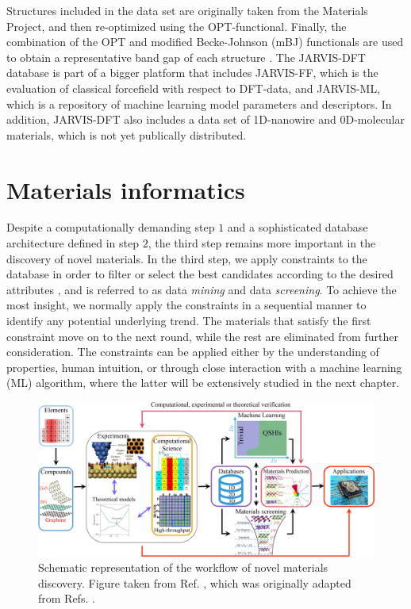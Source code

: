Structures included in the data set are originally taken from the Materials Project, and then re-optimized using the OPT-functional. Finally, the combination of the OPT and modified Becke-Johnson (mBJ) functionals are used to obtain a representative band gap of each structure \cite{Choudhary2018a}. %
The JARVIS-DFT database is part of a bigger platform that includes JARVIS-FF, which is the evaluation of classical forcefield with respect to DFT-data, and JARVIS-ML, which is a repository of machine learning model parameters and descriptors.
In addition, JARVIS-DFT also includes a data set of 1D-nanowire and 0D-molecular materials, which is not yet publically distributed.

\section{Materials informatics}

Despite a computationally demanding step $1$ and a sophisticated database architecture defined in step $2$, the third step remains more important in the discovery of novel materials. In the third step, we apply constraints to the database in order to filter or select the best candidates according to the desired attributes \cite{Schleder2019}, and is referred to as data \textit{mining} and data \textit{screening}. To achieve the most insight, we normally apply the constraints in a sequential manner to identify any potential underlying trend. The materials that satisfy the first constraint move on to the next round, while the rest are eliminated from further consideration. The constraints can be applied either by the understanding of properties, human intuition, or through close interaction with a machine learning (ML) algorithm, where the latter will be extensively studied in the next chapter.

\begin{figure}[ht!]
  \centering
  \includegraphics{theory/figures/ht-workflow.jpg}
  \caption{Schematic representation of the workflow of novel materials discovery.  Figure taken from Ref. \cite{Schleder2019}, which was originally adapted from Refs. \cite{Mounet2018, Acosta2018, Polini2013}.}
  \label{fig:ht-workflow}
\end{figure}

